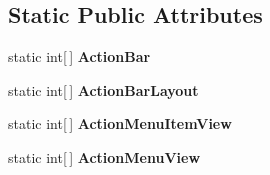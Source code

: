 \subsection*{Static Public Attributes}
\begin{DoxyCompactItemize}
\item 
static int\mbox{[}$\,$\mbox{]} {\bfseries Action\+Bar}
\item 
static int\mbox{[}$\,$\mbox{]} {\bfseries Action\+Bar\+Layout}
\item 
static int\mbox{[}$\,$\mbox{]} {\bfseries Action\+Menu\+Item\+View}
\item 
\hypertarget{classClient_1_1Droid_1_1Resource_1_1Styleable_a0aad8d71016848c0508b3141d1b2d3dc}{}static int\mbox{[}$\,$\mbox{]} {\bfseries Action\+Menu\+View}\label{classClient_1_1Droid_1_1Resource_1_1Styleable_a0aad8d71016848c0508b3141d1b2d3dc}


\end{DoxyCompactItemize}
